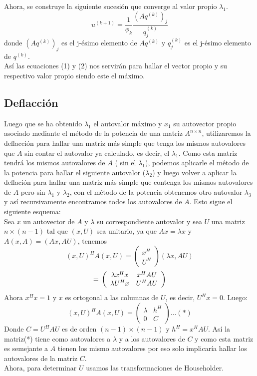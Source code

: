 \documentclass[12pt,a4paper]{article}
\begin{document}
\begin{multicols}{2}
Ahora, se construye la siguiente sucesión que converge al valor propio $\lambda_{1}$.
\begin{equation}\label{eigenvalue_iter}
u^{(k+1)} = \frac{1}{\phi_{k}}\frac{(Aq^{(k)})_{j}}{q^{(k)}_{j}}
\end{equation}
donde $(Aq^{(k)})_{j}$ es el j-ésimo elemento de $Aq^{(k)}$ y $q^{(k)}_{j}$ es el j-ésimo elemento de $q^{(k)}.$\\
Así las ecuaciones (1) y (2) nos servirán para hallar el vector propio y su respectivo valor propio siendo este el máximo.


\subsection{Deflacción}
\noindent Luego que se ha obtenido $\lambda_{1}$ el autovalor máximo y $x_{1}$ su autovector propio asociado mediante el método de la potencia de una matriz $A^{n\times n}$, utilizaremos la deflacción para hallar una matriz más simple que tenga los mismos autovalores que $A$ sin contar el autovalor ya calculado, es decir, el $\lambda_{1}$. Como esta matriz tendrá los mismos autovalores de $A$ ( sin el $\lambda_{1}$), podemos aplicarle el método de la potencia para hallar el siguiente autovalor ($\lambda_{2}$) y luego volver a aplicar la deflación para hallar una matriz más simple que contenga los mismos autovalores de $A$ pero sin $\lambda_{1}$ y $\lambda_{2}$, con el método de la potencia obtenemos otro autovalor $\lambda_{3}$ y así recursivamente encontramos todos los autovalores de $A$.
Esto sigue el siguiente esquema:\\
Sea $x$ un autovector de $A$ y $\lambda $ su correspondiente autovalor y sea $U$ una matriz $n\times(n-1)$ tal que $(x,U)$ sea unitario, ya que $Ax=\lambda x$ y $A(x,A)=(Ax,AU)$, tenemos$$(x,U)^{H}A(x,U)=\left(\begin{array}{c}
    x^{H} \\
     U^{H} 
\end{array}\right)\left(\lambda x,AU\right)$$ $$=\newline \left(\begin{array}{cc}
   \lambda x^{H}x  &  x^{H}AU\\
   \lambda U^{H}x  & U^{H}AU
\end{array}\right)$$
Ahora $x^{H}x=1$  y $x$ es ortogonal a las columnas de $U$, es decir, $U^{H}x=0$. Luego:\\
$$(x,U)^{H}A(x,U)=\left(\begin{array}{cc}
  \lambda   &  h^{H}\\
    0 & C
\end{array}\right)...(*)$$ Donde $C=U^{H}AU$ es de orden  $(n-1)\times (n-1)$ y $h^{H}=x^{H}AU$. Así la matriz(*) tiene como autovalores a $\lambda$ y a los autovalores de $C$ y como esta matriz es semejante a $A$ tienen los mismo autovalores por eso solo implicaría hallar los autovalores de la matriz $C$.\\
Ahora, para determinar $U$ usamos las transformaciones de Householder.\\


\end{multicols}
\end{document}
